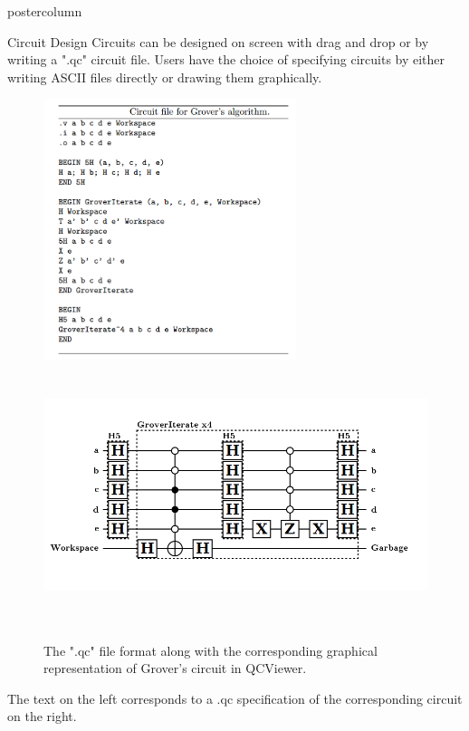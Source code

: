 \documentclass[final]{beamer} %
\begin{document}
\begin{frame}{}
\begin{columns}
        \begin{column}{.33\textwidth}
        \begin{beamercolorbox}[center,wd=\textwidth]{postercolumn}
        \begin{minipage}[T]{.95\textwidth}
            \begin{block}{\large Circuit Design}
                Circuits can be designed on screen with drag and drop or by writing a ".qc" circuit file. 
                Users have the choice of specifying circuits by either writing ASCII files directly or drawing them graphically. 
		        \begin{figure}[!htbp]
		            \centering
		            \includegraphics[height=3in]{figures/Grover_Text.png} \ \ \ \  \includegraphics[height=3in]{figures/Grover_Circuit.png}
		            \caption{The ".qc" file format along with the corresponding graphical representation of Grover's circuit in QCViewer.}
		        \end{figure}
                The text on the left corresponds to a .qc specification of the corresponding circuit on the right. 

\end{block}
\end{minipage}
\end{beamercolorbox}
\end{column}
\end{columns}
\end{frame}
\end{document}
